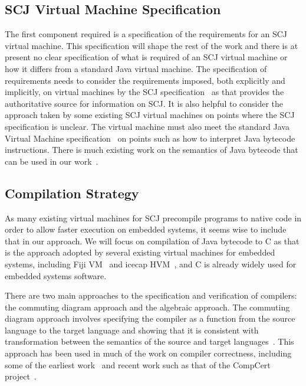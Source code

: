 \subsection{SCJ Virtual Machine Specification}

The first component required is a specification of the requirements
for an SCJ virtual machine.
This specification will shape the rest of the work and there is at
present no clear specification of what is required of an SCJ virtual
machine or how it differs from a standard Java virtual machine.
The specification of requirements needs to consider the requirements
imposed, both explicitly and implicitly, on virtual machines by the
SCJ specification~\cite{locke2013} as that provides the authoritative
source for information on SCJ.
It is also helpful to consider the approach taken by some existing SCJ
virtual machines on points where the SCJ specification is unclear.
The virtual machine must also meet the standard Java Virtual Machine
specification~\cite{lindholm2014} on points such as how to interpret
Java bytecode instructions.
There is much existing work on the semantics of Java bytecode that can
be used in our work~\cite{bertelsen2000, jones1998, stark2001}.

\subsection{Compilation Strategy}

As many existing virtual machines for SCJ precompile programs to
native code in order to allow faster execution on embedded systems, it
seems wise to include that in our approach.
We will focus on compilation of Java bytecode to C as that is the
approach adopted by several existing virtual machines for embedded
systems, including Fiji VM~\cite{pizlo2009} and icecap
HVM~\cite{sondergaard2012}, and C is already widely used for embedded
systems software.

There are two main approaches to the specification and verification of
compilers: the commuting diagram approach and the algebraic approach.
The commuting diagram approach involves specifying the compiler as a
function from the source language to the target language and showing
that it is consistent with transformation between the semantics of the
source and target languages~\cite{morris1973, thatcher1979}.
This approach has been used in much of the work on compiler
correctness, including some of the earliest work~\cite{mccarthy1967}
and recent work such as that of the CompCert project~\cite{leroy2009a,
  leroy2009b}.

